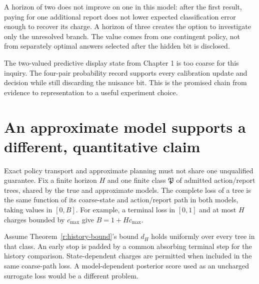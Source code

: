 A horizon of two does not improve on one in this model: after the first result, paying for one additional report does not lower expected classification error enough to recover its charge. A horizon of three creates the option to investigate only the unresolved branch. The value comes from one contingent policy, not from separately optimal answers selected after the hidden bit is disclosed.



The two-valued predictive display state from Chapter 1 is too coarse for this inquiry. The four-pair probability record supports every calibration update and decision while still discarding the nuisance bit. This is the promised chain from evidence to representation to a useful experiment choice.

\section{An approximate model supports a different, quantitative claim}
Exact policy transport and approximate planning must not share one unqualified guarantee. Fix a finite horizon $H$ and one finite class $\mathfrak P$ of admitted action/report trees, shared by the true and approximate models. The complete loss of a tree is the same function of its coarse-state and action/report path in both models, taking values in $[0,B]$. For example, a terminal loss in $[0,1]$ and at most $H$ charges bounded by $c_{\max}$ give $B=1+Hc_{\max}$.

Assume Theorem~\ref{r:history-bound}'s bound $d_H$ holds uniformly over every tree in that class. An early stop is padded by a common absorbing terminal step for the history comparison. State-dependent charges are permitted when included in the same coarse-path loss. A model-dependent posterior score used as an uncharged surrogate loss would be a different problem.

